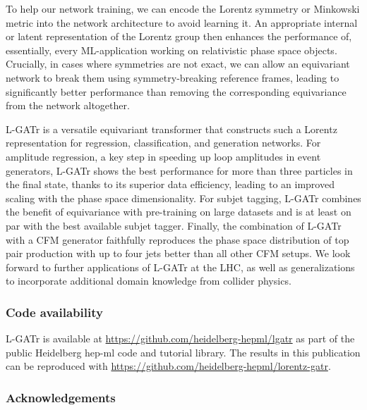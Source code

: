 \documentclass[submission, Phys]{SciPost}
\begin{document}
To help our network training, we can encode the Lorentz symmetry or Minkowski metric into the network architecture to avoid learning it. An appropriate internal or latent representation of the Lorentz group then enhances the performance of, essentially, every ML-application working on relativistic phase space objects. Crucially, in cases where symmetries are not exact, we can allow an equivariant network to break them using symmetry-breaking reference frames, leading to significantly better performance than removing the corresponding equivariance from the network altogether.

L-GATr is a versatile  equivariant transformer that constructs such a Lorentz representation for regression, classification, and generation networks.
For amplitude regression, a key step in speeding up loop amplitudes in event generators, L-GATr shows the best performance for more than three particles in the final state, thanks to its superior data efficiency, leading to an improved scaling with the phase space dimensionality.
For subjet tagging, L-GATr combines the benefit of equivariance with pre-training on large datasets and is at least on par with the best available subjet tagger.
Finally, the combination of L-GATr with a CFM generator faithfully reproduces the phase space distribution of top pair production with up to four jets better than all other CFM setups.
%
We look forward to further applications of L-GATr at the LHC, as well as generalizations to incorporate additional domain knowledge from collider physics.

\subsubsection*{Code availability}

L-GATr is available at \url{https://github.com/heidelberg-hepml/lgatr} as part of the public Heidelberg hep-ml code and tutorial library. The results in this publication can be reproduced with \url{https://github.com/heidelberg-hepml/lorentz-gatr}.

\subsubsection*{Acknowledgements}
\end{document}

